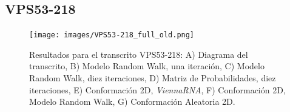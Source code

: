 \documentclass[a4paper,11pt,titlepage]{article}
\theoremstyle{definition}
\begin{document}
\subsection*{VPS53-218}\label{subsec:gene3}

\begin{figure}[H]
    \centering
    \texttt{[image: images/VPS53-218\_full\_old.png]}
    \small{\caption{Resultados para el transcrito VPS53-218: A) Diagrama del transcrito, B) Modelo Random Walk, una iteración, C) Modelo Random Walk, diez iteraciones, D) Matriz de Probabilidades, diez iteraciones, E) Conformación 2D, \textit{ViennaRNA}, F) Conformación 2D, Modelo Random Walk, G) Conformación Aleatoria 2D.}\label{fig:VPS53-218-diag}}\normalsize
\end{figure}

%
%
\end{document}
